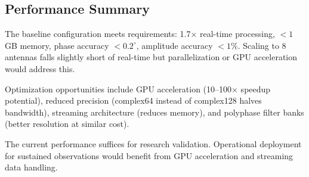 \subsection{Performance Summary}

The baseline configuration meets requirements: 1.7$\times$ real-time processing, $< 1$ GB memory, phase accuracy $< 0.2^\circ$, amplitude accuracy $< 1\%$. Scaling to 8 antennas falls slightly short of real-time but parallelization or GPU acceleration would address this.

Optimization opportunities include GPU acceleration (10–100$\times$ speedup potential), reduced precision (complex64 instead of complex128 halves bandwidth), streaming architecture (reduces memory), and polyphase filter banks (better resolution at similar cost).

The current performance suffices for research validation. Operational deployment for sustained observations would benefit from GPU acceleration and streaming data handling.
